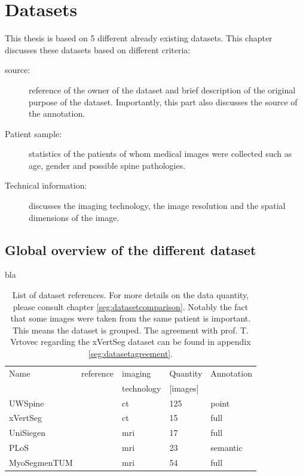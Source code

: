\chapter{Datasets}

This thesis is based on 5 different already existing datasets.
This chapter discusses these datasets based on different criteria:

\begin{description}
    \item[source:] reference of the owner of the dataset and brief description of the original purpose of the dataset. Importantly, this part also discusses the source of the annotation.
    \item[Patient sample:] statistics of the patients of whom medical images were collected such as age, gender and possible spine pathologies.
    \item[Technical information:] discusses the imaging technology, the image resolution and the spatial dimensions of the image. 
\end{description}

\section{Global overview of the different dataset}




bla

\begin{table}
 
    \begin{tabular}{ l l l l l} 
     \hline
     \hline
     Name & reference & imaging & Quantity & Annotation \\
          &           & technology & [images] & \\
     \hline 
    UWSpine & \cite{Glocker}  & \acrshort{ct} & 125 & point  \\ 
    xVertSeg & \cite{Ibragimov2014, Korez2015} & \acrshort{ct} & 15 & full \\
    UniSiegen  & \cite{Zukic2014} & \acrshort{mri} & 17 & full \\
    PLoS & \cite{Chu2015} & \acrshort{mri} & 23 & semantic \\
    MyoSegmenTUM & \cite{Burian2019} & \acrshort{mri} &  54 & full \\
     \hline
     \hline
    \end{tabular}
    \caption{List of dataset references. For more details on the data quantity, please consult chapter \ref{seg:datasetcomparison}. 
    Notably the fact that some images were taken from the same patient is important. This means the dataset is grouped. 
    The agreement with prof. T. Vrtovec regarding the xVertSeg dataset can be found in appendix \ref{seg:datasetagreement}.}

\end{table}

